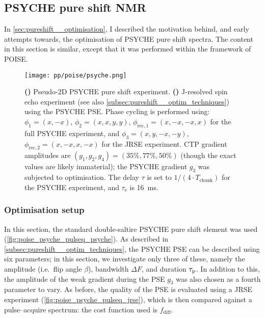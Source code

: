 \subsection{PSYCHE pure shift NMR}
\label{subsec:poise__psyche}

In \cref{sec:pureshift__optimisation}, I described the motivation behind, and early attempts towards, the optimisation of PSYCHE pure shift spectra.
The content in this section is similar, except that it was performed within the framework of POISE.

\begin{figure}[htb]
    \centering
    \texttt{[image: pp/poise/psyche.png]}%
    {\label{fig:poise_psyche_pulseq_psyche}}%
    {\label{fig:poise_psyche_pulseq_jrse}}%
    \caption[Pulse sequences used for PSYCHE optimisations]{
        \textbf{()} Pseudo-2D PSYCHE pure shift experiment.
        \textbf{()} J-resolved spin echo experiment (see also \cref{subsec:pureshift__optim_techniques}) using the PSYCHE PSE.
        Phase cycling is performed using: $\phi_1 = (x, -x)$, $\phi_2 = (x, x, y, y)$, $\phi_{\text{rec},1} = (x, -x, -x, x)$ for the full PSYCHE experiment, and $\phi_3 = (x, y, -x, -y)$, $\phi_{\text{rec},2} = (x, -x, x, -x)$ for the JRSE experiment.
        CTP gradient amplitudes are $(g_1, g_2, g_4) = (35\%, 77\%, 50\%)$ (though the exact values are likely immaterial); the PSYCHE gradient $g_3$ was subjected to optimisation.
        The delay $\tau$ is set to $1/(4 \cdot T_\text{chunk})$ for the PSYCHE experiment, and $\tau_\text{e}$ is \qty{16}{\ms}.
    }
    \label{fig:poise_psyche_pulseq}
\end{figure}



\subsubsection{Optimisation setup}

In this section, the standard double-saltire PSYCHE pure shift element was used (\cref{fig:poise_psyche_pulseq_psyche}).\autocite{Foroozandeh2014ACIE,Foroozandeh2018CEJ}
As described in \cref{subsec:pureshift__optim_techniques}, the PSYCHE PSE can be described using six parameters; in this section, we investigate only three of these, namely the amplitude (i.e.\ flip angle $\beta$), bandwidth $\Delta F$, and duration $\tau_\mathrm{p}$.
In addition to this, the amplitude of the weak gradient during the PSE $g_3$ was also chosen as a fourth parameter to vary.
As before, the quality of the PSE is evaluated using a JRSE experiment (\cref{fig:poise_psyche_pulseq_jrse}), which is then compared against a pulse--acquire spectrum: the cost function used is $f_\text{diff}$.

